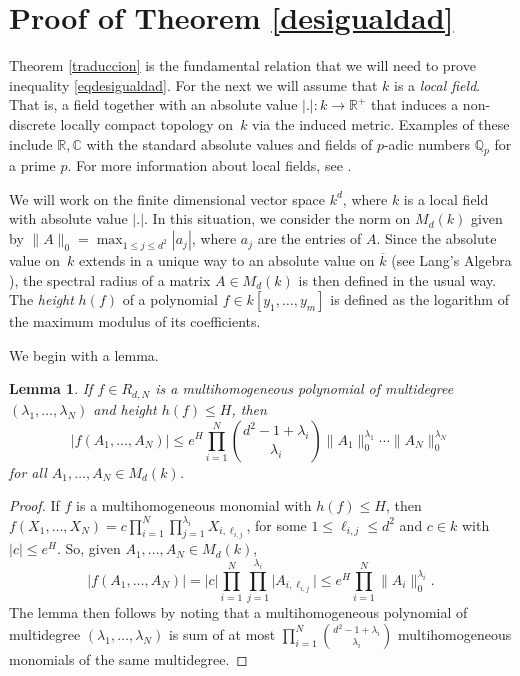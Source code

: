 \documentclass[JEP,XML,SOM,Unicode,NoEqCountersInSection]{cedram}
\theoremstyle{plain}
\newtheorem{lema}[teo]{Lemma}
\theoremstyle{definition}
\newcommand{\CC}{\mathbb{C}}
\newcommand{\RR}{\mathbb{R}}
\begin{document}
\section{Proof of Theorem \ref{desigualdad}}\label{pruebadesigualdad}

Theorem \ref{traduccion} is the fundamental relation that we will need to prove inequality \eqref{eqdesigualdad}. For the next we will assume that $k$ is a \textit{local field}. That is, a field together with an absolute value $|.|:k\rightarrow \RR^{+}$ that induces a non-discrete locally compact topology on~$k$ via the induced metric. Examples of these include $\RR,\CC$ with the standard absolute values and fields of $p$-adic numbers $\mathbb{Q}_{p}$ for a prime $p$. For more information about local fields, see \cite{lorentz}.

We will work on the finite dimensional vector space $k^d$, where $k$ is a local field with absolute value $|.|$. In this situation, we consider the norm on $M_{d}(k)$ given by $\|A\|_{0}=\max_{1\leq j\leq d^2}{|a_{j}|}$, where $a_j$ are the entries of $A$. Since the absolute value on~$k$ extends in a unique way to an absolute value on $\overline{k}$ (see Lang's Algebra \cite[XII.2, Prop.\,2.5]{langalg}), the spectral radius of a matrix $A\in M_{d}(k)$ is then defined in the usual way.
The \emph{height} $h(f)$ of a polynomial $f\in k[y_1,\dots,y_m]$ is defined as the logarithm of the maximum modulus of its coefficients.

We begin with a lemma.

\begin{lema}\label{cotahomo}If $f \in R_{d,N}$ is a multihomogeneous polynomial of multidegree $(\lambda_1,\dots,\lambda_{N})$ and height $h(f)\leq H$, then
\begin{equation*}
|f(A_1,\dots,A_N)|\leq e^H\prod_{i=1}^{N}{\binom{d^2-1+\lambda_i}{\lambda_i}}\|A_1\|_{0}^{\lambda_1}\cdots\|A_{N}\|_{0}^{\lambda_N}
\end{equation*}
for all $A_1,\dots,A_N\in M_{d}(k)$.
\end{lema}

\begin{proof}
If $f$ is a multihomogeneous monomial with $h(f)\!\leq\!H$, then
$f(X_1,\dots,X_N)=c\prod_{i=1}^{N}{\prod_{j=1}^{\lambda_{i}}{X_{i ,\ell_{i,j}}}}$, for some $1\leq\ell_{i,j} \leq d^2$ and $c\in k$ with $|c|\leq e^H$. So, given $A_1,\dots,A_N\in M_{d}(k)$,
\begin{equation*}
|f(A_1,\dots,A_N)|=|c|\prod_{i=1}^{N}{\prod_{j=1}^{\lambda_{i}}{|A_{i ,\ell_{i,j}}}|}\leq e^H\prod_{i=1}^{N}{\|A_i\|_{0}^{\lambda_{i}}}.
\end{equation*}
The lemma then follows by noting that a multihomogeneous polynomial of multidegree $(\lambda_1,\dots,\lambda_N)$ is sum of at most $\prod_{i=1}^{N}{\binom{d^2-1+\lambda_i}{\lambda_i}}$ multihomogeneous monomials of the same multidegree.
\end{proof}
\end{document}
